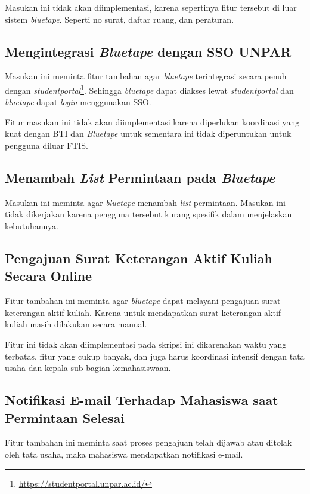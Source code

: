 Masukan ini tidak akan diimplementasi, karena sepertinya fitur tersebut di luar sistem \textit{bluetape}. Seperti no surat, daftar ruang, dan peraturan.

\subsection{Mengintegrasi \textit{Bluetape} dengan SSO UNPAR}
\label{issue:14}
Masukan ini meminta fitur tambahan agar \textit{bluetape} terintegrasi secara penuh dengan \textit{studentportal}\footnote{\url{https://studentportal.unpar.ac.id/}}. Sehingga \textit{bluetape} dapat diakses lewat \textit{studentportal} dan \textit{bluetape} dapat \textit{login} menggunakan SSO.

Fitur masukan ini tidak akan diimplementasi karena diperlukan koordinasi yang kuat dengan BTI dan \textit{Bluetape} untuk sementara ini tidak diperuntukan untuk pengguna diluar FTIS.

\subsection{Menambah \textit{List} Permintaan pada \textit{Bluetape}}
\label{issue:15}
Masukan ini meminta agar \textit{bluetape} menambah \textit{list} permintaan. Masukan ini tidak dikerjakan karena pengguna tersebut kurang spesifik dalam menjelaskan kebutuhannya.

\subsection{Pengajuan Surat Keterangan Aktif Kuliah Secara Online}
\label{issue:16}
Fitur tambahan ini meminta agar \textit{bluetape} dapat melayani pengajuan surat keterangan aktif kuliah. Karena untuk mendapatkan surat keterangan aktif kuliah masih dilakukan secara manual.

Fitur ini tidak akan diimplementasi pada skripsi ini dikarenakan waktu yang terbatas, fitur yang cukup banyak, dan juga harus koordinasi intensif dengan tata usaha dan kepala sub bagian kemahasiswaan.

\subsection{Notifikasi E-mail Terhadap Mahasiswa saat Permintaan Selesai}
\label{issue:17}
Fitur tambahan ini meminta saat proses pengajuan telah dijawab atau ditolak oleh tata usaha, maka mahasiswa mendapatkan notifikasi e-mail.
 

